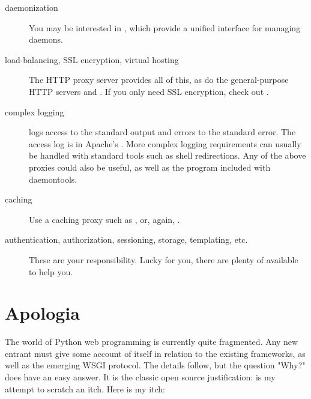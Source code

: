 \begin{description}

\item[daemonization]
    {You may be interested in , which provide a unified
    interface for managing daemons.}

\item[load-balancing, SSL encryption, virtual hosting]
    {The HTTP proxy server  provides
    all of this, as do the general-purpose HTTP servers
     and
    . If you only need SSL encryption,
    check out .}

\item[complex logging]
    { logs access to the standard output and errors to the standard
    error. The access log is in Apache's . More complex
    logging requirements can usually be handled with standard tools such as
    shell redirections. Any of the above proxies could also be useful, as well
    as the  program included with daemontools.}

\item[caching]
    {Use a caching proxy such as , or,
    again, .}

\item[authentication, authorization, sessioning, storage, templating, etc.]
    {These are your responsibility. Lucky for you, there are plenty of
     available to help
    you.}

\end{description}



\section{Apologia \label{apologia}}

The world of Python web programming is currently quite fragmented. Any new
entrant must give some account of itself in relation to the existing frameworks,
as well as the emerging WSGI protocol. The details follow, but the question
"Why?" does have an easy answer. It is the classic open source justification:
 is my attempt to scratch an itch. Here is my itch:

